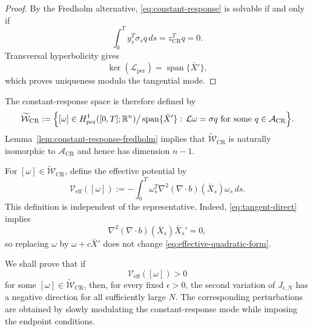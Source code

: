 \documentclass[preprint,12pt]{elsarticle}
\theoremstyle{definition}
\theoremstyle{plain}
\begin{document}
\begin{proof}
By the Fredholm alternative, \eqref{eq:constant-response} is solvable
if and only if
\begin{equation*}
    \int_0^T y_s^T\sigma_s q\,ds
    =
    z_{\mathrm{CR}}^Tq
    =
    0.
\end{equation*}
Transversal hyperbolicity gives
\begin{equation*}
    \ker(\mathcal L_{\mathrm{per}})
    =
    \operatorname{span}\{\bar X'\},
\end{equation*}
which proves uniqueness modulo the tangential mode.
\end{proof}

The constant-response space is therefore defined by
\begin{equation}
\label{eq:WCR-quotient}
\begin{aligned}
\widetilde{\mathcal W}_{\mathrm{CR}}
:=
\Bigl\{
    [\omega]\in
    H^1_{\mathrm{per}}([0,T];\mathbb R^n)
    \big/
    \operatorname{span}\{\bar X'\}:\,
    \mathcal L\omega=\sigma q
    \text{ for some }
    q\in\mathcal A_{\mathrm{CR}}
\Bigr\}.
\end{aligned}
\end{equation}
Lemma~\ref{lem:constant-response-fredholm} implies that
$\widetilde{\mathcal W}_{\mathrm{CR}}$ is naturally isomorphic to
$\mathcal A_{\mathrm{CR}}$ and hence has dimension $n-1$.

For $[\omega]\in\widetilde{\mathcal W}_{\mathrm{CR}}$, define the
effective potential by
\begin{equation}
\label{eq:effective-quadratic-form}
    \mathcal V_{\mathrm{eff}}([\omega])
    :=
    -
    \int_0^T
    \omega_s^T
    \nabla^2(\nabla\!\cdot b)(\bar X_s)
    \omega_s\,ds.
\end{equation}
This definition is independent of the representative. Indeed,
\eqref{eq:tangent-direct} implies
\begin{equation*}
    \nabla^2(\nabla\!\cdot b)(\bar X_s)\bar X_s'=0,
\end{equation*}
so replacing $\omega$ by $\omega+c\bar X'$ does not change
\eqref{eq:effective-quadratic-form}.

We shall prove that if
\begin{equation}
\label{eq:positive-effective-potential}
    \mathcal V_{\mathrm{eff}}([\omega])>0
\end{equation}
for some
$[\omega]\in\widetilde{\mathcal W}_{\mathrm{CR}}$, then, for every
fixed $\epsilon>0$, the second variation of $J_{\epsilon,N}$ has a
negative direction for all sufficiently large $N$. The corresponding
perturbations are obtained by slowly modulating the constant-response
mode while imposing the endpoint conditions.
\end{document}
